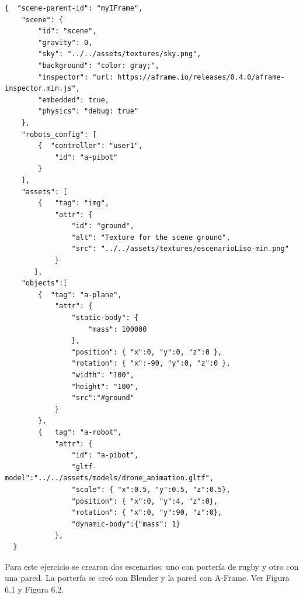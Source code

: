 \begin{lstlisting}
{  "scene-parent-id": "myIFrame",
    "scene": {
        "id": "scene",
        "gravity": 0,
        "sky": "../../assets/textures/sky.png",
        "background": "color: gray;",
        "inspector": "url: https://aframe.io/releases/0.4.0/aframe-inspector.min.js",
        "embedded": true,
        "physics": "debug: true"
    },
    "robots_config": [
        {  "controller": "user1",
            "id": "a-pibot"
        }
    ],
    "assets": [
        {   "tag": "img",
            "attr": {
                "id": "ground",
                "alt": "Texture for the scene ground",
                "src": "../../assets/textures/escenarioLiso-min.png"
            }
       ],
    "objects":[
        {  "tag": "a-plane",
            "attr": {
                "static-body": {
                    "mass": 100000
                },
                "position": { "x":0, "y":0, "z":0 },
                "rotation": { "x":-90, "y":0, "z":0 },
                "width": "100",
                "height": "100",
                "src":"#ground"
            }
        },
        {   tag": "a-robot",
            "attr": {
                "id": "a-pibot",
                "gltf-model":"../../assets/models/drone_animation.gltf",
                "scale": { "x":0.5, "y":0.5, "z":0.5},
                "position": { "x":0, "y":4, "z":0},
                "rotation": { "x":0, "y":90, "z":0},
                "dynamic-body":{"mass": 1}
            },      
  }
\end{lstlisting}

Para este ejercicio se crearon dos escenarios: uno con portería de rugby y otro con una pared. La portería se creó con Blender y la pared con A-Frame. Ver Figura 6.1 y Figura 6.2.

